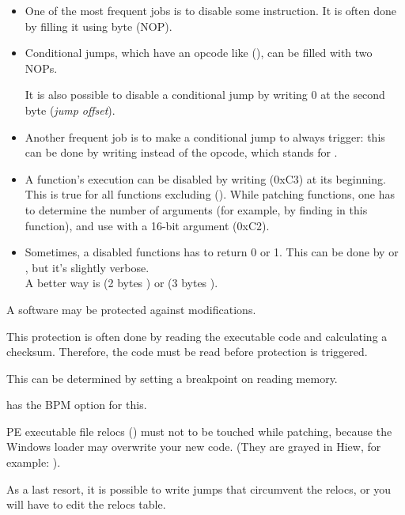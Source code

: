 \begin{itemize}

\item 
One of the most frequent jobs is to disable some instruction.
It is often done by filling it using byte 
 (\ac{NOP}).

\item Conditional jumps, which have an opcode like  (\JZ), 
can be filled with two \ac{NOP}s.

It is also possible to disable a conditional jump by writing 0 at the second byte (\emph{jump offset}).

\item 
Another frequent job is to make a conditional jump to always trigger: 
this can be done by writing  
instead of the opcode, which stands for \JMP.

\item A function's execution can be disabled by writing \RETN (0xC3) at its beginning.
This is true for all functions excluding  ().
While patching  functions, one has to determine the number of arguments (for example, 
by finding \RETN in this function), 
and use \RETN with a 16-bit argument (0xC2).

\item Sometimes, a disabled functions has to return 0 or 1.
This can be done by  or , 
but it's slightly verbose.\\
A better way is  (2 bytes ) or  (3 bytes ).

\end{itemize}

A software may be protected against modifications.

This protection is often done by reading the executable code and calculating a checksum.
Therefore, 
the code must be read before protection is triggered.

This can be determined by setting a breakpoint on reading memory.

\tracer has the BPM option for this.

PE executable file relocs () 
must not to be touched while patching, 
because the Windows loader may overwrite your new code.
(They are grayed in Hiew, for example:
).

As a last resort, it is possible to write jumps that circumvent the relocs, 
or you will have to edit the relocs table.

